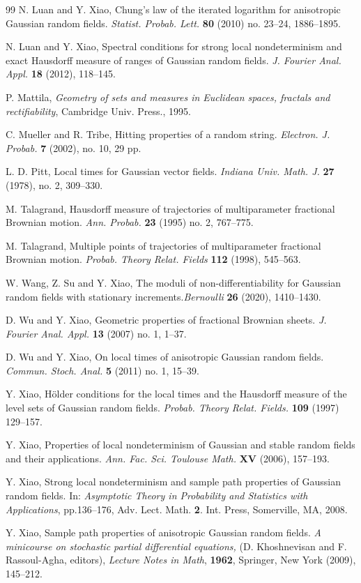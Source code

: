 \documentclass[11pt, reqno]{amsart}
\numberwithin{equation}{section}
\begin{document}
\begin{thebibliography}{99}
N. Luan and Y. Xiao, Chung's law of the iterated logarithm for anisotropic Gaussian random fields. {\it Statist. 
Probab. Lett.} {\bf 80} (2010) no. 23--24, 1886--1895.

N. Luan and Y. Xiao,  Spectral conditions for strong local nondeterminism
and exact Hausdorff measure of ranges of Gaussian random fields.
{\it J. Fourier Anal. Appl.} {\bf 18} (2012), 118--145.

P. Mattila, {\it Geometry of sets and measures in Euclidean spaces, fractals and rectifiability}, Cambridge Univ. Press., 1995.


C. Mueller and R. Tribe, Hitting properties of a random string. {\em Electron. J. Probab.}
{\bf 7} (2002), no. 10, 29 pp.

L. D. Pitt, Local times for Gaussian vector fields. {\it Indiana Univ.
Math. J.} {\bf 27} (1978), no. 2, 309--330.

M. Talagrand, Hausdorff measure of trajectories of multiparameter fractional Brownian motion. {\it Ann. Probab.} {\bf 23} 
(1995) no. 2, 767--775.

M. Talagrand, Multiple points of trajectories of multiparameter fractional Brownian motion.
{\it Probab. Theory Relat. Fields} {\bf 112} (1998), 545--563.

W. Wang, Z. Su and Y. Xiao, The moduli of non-differentiability for Gaussian random fields with stationary 
increments.{\it  Bernoulli } {\bf 26} (2020), 1410--1430.


D. Wu and Y. Xiao, Geometric properties of fractional Brownian sheets. {\it J. Fourier Anal. Appl.} {\bf 13} (2007) no. 1, 1--37.

D. Wu and Y. Xiao, On local times of anisotropic Gaussian random fields. {\it Commun. Stoch. Anal.} {\bf 5} (2011) no. 1, 15--39.

Y. Xiao, H\"{o}lder conditions for the local times and the Hausdorff measure of the level sets of Gaussian random fields. 
{\it Probab. Theory Relat. Fields.} {\bf 109} (1997) 129--157.

Y. Xiao, Properties of local nondeterminism of Gaussian and stable
random fields and their applications. {\it Ann. Fac. Sci. Toulouse Math.}
{\bf XV} (2006), 157--193.

Y. Xiao, Strong local nondeterminism and sample path properties of
Gaussian random fields. In: {\it Asymptotic Theory in Probability and
Statistics with Applications},  pp.136--176, Adv. Lect. Math. {\bf 2}.
Int. Press, Somerville, MA, 2008.

Y. Xiao, Sample path properties of anisotropic Gaussian random fields. { \em A minicourse 
on stochastic partial differential equations,} 
(D. Khoshnevisan and F. Rassoul-Agha, editors),
{\em Lecture Notes in Math}, \textbf{1962},   Springer, New York (2009), 145--212.

\end{thebibliography}
\end{document}
